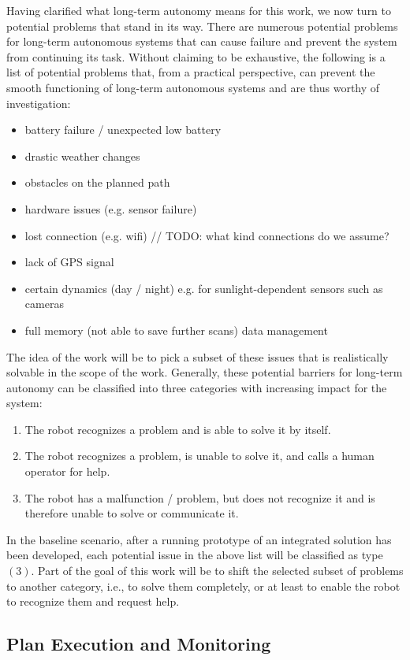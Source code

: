 \documentclass[english, master, expose, utf8]{base/thesis_KBS}
\begin{document}
Having clarified what long-term autonomy means for this work, we now turn to potential problems that stand in its way.
There are numerous potential problems for long-term autonomous systems that can cause failure and prevent the system from continuing its task.
Without claiming to be exhaustive, the following is a list of potential problems that, from a practical perspective, can prevent the smooth functioning
of long-term autonomous systems and are thus worthy of investigation:
\begin{itemize}
    \item battery failure / unexpected low battery
    \item drastic weather changes
    \item obstacles on the planned path
    \item hardware issues (e.g. sensor failure)
    \item lost connection (e.g. wifi) // TODO: what kind connections do we assume?
    \item lack of GPS signal
    \item certain dynamics (day / night) e.g. for sunlight-dependent sensors such as cameras
    \item full memory (not able to save further scans) \textrightarrow data management
\end{itemize}
The idea of the work will be to pick a subset of these issues that is realistically solvable in the scope of the work.
Generally, these potential barriers for long-term autonomy can be classified into three categories with increasing impact for the system:
\begin{enumerate}
    \item The robot recognizes a problem and is able to solve it by itself.
    \item The robot recognizes a problem, is unable to solve it, and calls a human operator for help.
    \item The robot has a malfunction / problem, but does not recognize it and is therefore unable to solve or communicate it.
\end{enumerate}
In the baseline scenario, after a running prototype of an integrated solution has been developed, each potential issue in the above list will be classified as type $(3)$.
Part of the goal of this work will be to shift the selected subset of problems to another category, i.e., to solve them completely, 
or at least to enable the robot to recognize them and request help.

\subsection{Plan Execution and Monitoring}
\end{document}
